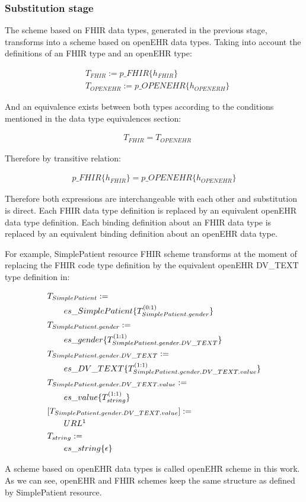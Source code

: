 \subsubsection{Substitution stage}

The scheme based on FHIR data types, generated in the previous stage, transforms into a scheme based on openEHR data types. Taking into account the definitions of an FHIR type and an openEHR type:

\begin{align*}
&T_{FHIR}:=p\_FHIR\{h_{FHIR}\} \\
&T_{OPENEHR}:=p\_OPENEHR\{h_{OPENERH}\}
\end{align*}

\noindent
And an equivalence exists between both types according to the conditions mentioned in the data type equivalences section:

\begin{align*}
&T_{FHIR} = T_{OPENEHR}
\end{align*}

\noindent
Therefore by transitive relation:

\begin{align*}
p\_FHIR\{h_{FHIR}\} = p\_OPENEHR\{h_{OPENEHR}\}
\end{align*}

\noindent
Therefore both expressions are interchangeable with each other and substitution is direct. Each FHIR data type definition is replaced by an equivalent openEHR data type definition. Each binding definition about an FHIR data type is replaced by an equivalent binding definition about an openEHR data type.

For example, SimplePatient resource FHIR scheme transforms at the moment of replacing the FHIR code type definition by the equivalent openEHR DV\_TEXT type definition in:

\begin{align*}
&T_{SimplePatient}:= \\
&\qquad es\_SimplePatient\{T_{SimplePatient.gender}^{(0:1)}\} \\
&T_{SimplePatient.gender}:= \\
&\qquad es\_gender\{T_{SimplePatient.gender.DV\_TEXT}^{(1:1)}\} \\
&T_{SimplePatient.gender.DV\_TEXT}:= \\
&\qquad es\_DV\_TEXT\{T_{SimplePatient.gender.DV\_TEXT.value}^{(1:1)}\} \\
&T_{SimplePatient.gender.DV\_TEXT.value}:= \\
&\qquad es\_value\{T_{string}^{(1:1)}\} \\
&[T_{SimplePatient.gender.DV\_TEXT.value}] := \\
&\qquad URL \footnotemark[1] \\
&T_{string}:= \\
&\qquad es\_string\{\epsilon\} \\
\end{align*}

A scheme based on openEHR data types is called open\-EHR scheme in this work. As we can see, openEHR and FHIR schemes keep the same structure as defined by SimplePatient resource.
